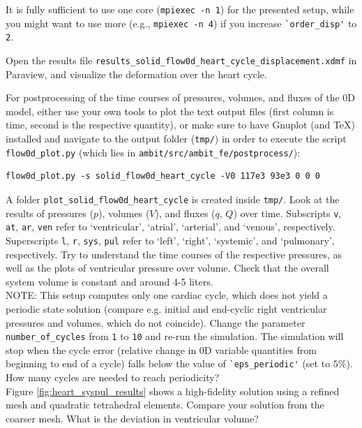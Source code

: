 \documentclass[a4paper,12pt]{report}
\begin{document}
It is fully sufficient to use one core (\verb"mpiexec -n 1") for the presented setup, while you might want to use more (e.g., \verb"mpiexec -n 4") if you increase \verb"`order_disp'" to \verb"2".

Open the results file \verb"results_solid_flow0d_heart_cycle_displacement.xdmf" in Paraview, and visualize the deformation over the heart cycle.

For postprocessing of the time courses of pressures, volumes, and fluxes of the 0D model, either use your own tools to plot the text output files (first column is time, second is the respective quantity), or make sure to have Gnuplot (and TeX) installed and navigate to the output folder (\verb"tmp/") in order to execute the script \verb"flow0d_plot.py" (which lies in \verb"ambit/src/ambit_fe/postprocess/"):
\begin{verbatim}
flow0d_plot.py -s solid_flow0d_heart_cycle -V0 117e3 93e3 0 0 0
\end{verbatim}

A folder \verb"plot_solid_flow0d_heart_cycle" is created inside \verb"tmp/". Look at the results of pressures ($p$), volumes ($V$), and fluxes ($q$, $Q$) over time.
Subscripts \verb"v", \verb"at", \verb"ar", \verb"ven" refer to `ventricular', `atrial', `arterial', and `venous', respectively. Superscripts \verb"l", \verb"r", \verb"sys", \verb"pul" refer to `left', `right', `systemic', and
`pulmonary', respectively.
Try to understand the time courses of the respective pressures, as well as the plots of ventricular pressure over volume.
Check that the overall system volume is constant and around 4-5 liters.\\

NOTE: This setup computes only one cardiac cycle, which does not yield a periodic state solution (compare e.g. initial and end-cyclic right ventricular pressures and volumes,
which do not coincide). Change the parameter \verb"number_of_cycles" from \verb"1" to \verb"10" and re-run the simulation. The simulation will stop when the cycle error (relative change in 0D variable quantities from beginning to end of a cycle) falls below the value of \verb"`eps_periodic'" (set to $5 \%$). How many cycles are needed to reach periodicity?\\

Figure \ref{fig:heart_syspul_results} shows a high-fidelity solution using a refined mesh and quadratic tetrahedral elements. Compare your solution from the coarser mesh. What is the deviation
in ventricular volume?
\end{document}
